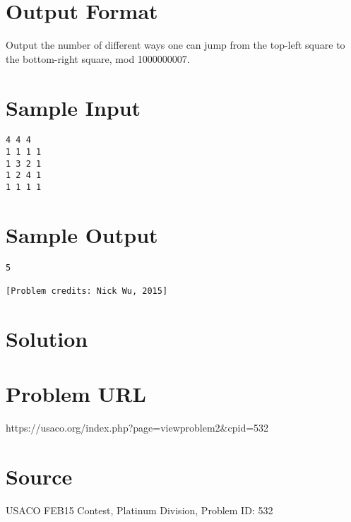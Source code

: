 \documentclass[12pt]{article}
\begin{document}
\section*{Output Format}
Output the number of different ways one can jump from the top-left square to the bottom-right square, mod 1000000007.

\section*{Sample Input}
\begin{verbatim}
4 4 4
1 1 1 1
1 3 2 1
1 2 4 1
1 1 1 1
\end{verbatim}

\section*{Sample Output}
\begin{verbatim}
5

[Problem credits: Nick Wu, 2015]
\end{verbatim}

\section*{Solution}


\section*{Problem URL}
https://usaco.org/index.php?page=viewproblem2&cpid=532

\section*{Source}
USACO FEB15 Contest, Platinum Division, Problem ID: 532
\end{document}

